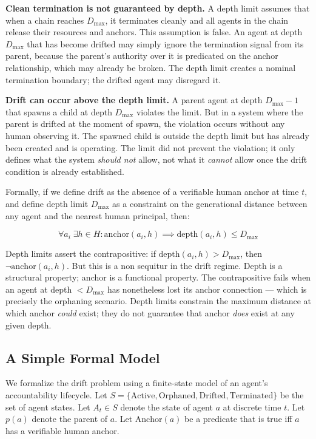 \textbf{Clean termination is not guaranteed by depth.} A depth limit assumes that when a chain reaches $D_{\max}$, it terminates cleanly and all agents in the chain release their resources and anchors. This assumption is false. An agent at depth $D_{\max}$ that has become drifted may simply ignore the termination signal from its parent, because the parent's authority over it is predicated on the anchor relationship, which may already be broken. The depth limit creates a nominal termination boundary; the drifted agent may disregard it.

\textbf{Drift can occur above the depth limit.} A parent agent at depth $D_{\max} - 1$ that spawns a child at depth $D_{\max}$ violates the limit. But in a system where the parent is drifted at the moment of spawn, the violation occurs without any human observing it. The spawned child is outside the depth limit but has already been created and is operating. The limit did not prevent the violation; it only defines what the system \emph{should not} allow, not what it \emph{cannot} allow once the drift condition is already established.

Formally, if we define drift as the absence of a verifiable human anchor at time $t$, and define depth limit $D_{\max}$ as a constraint on the generational distance between any agent and the nearest human principal, then:

\[
\forall a_i \; \exists h \in H : \text{anchor}(a_i, h) \implies \text{depth}(a_i, h) \leq D_{\max}
\]

Depth limits assert the contrapositive: if $\text{depth}(a_i, h) > D_{\max}$, then $\neg \text{anchor}(a_i, h)$. But this is a non sequitur in the drift regime. Depth is a structural property; anchor is a functional property. The contrapositive fails when an agent at depth $< D_{\max}$ has nonetheless lost its anchor connection --- which is precisely the orphaning scenario. Depth limits constrain the maximum distance at which anchor \emph{could} exist; they do not guarantee that anchor \emph{does} exist at any given depth.

\subsection{A Simple Formal Model}

We formalize the drift problem using a finite-state model of an agent's accountability lifecycle. Let $S = \{\text{Active}, \text{Orphaned}, \text{Drifted}, \text{Terminated}\}$ be the set of agent states. Let $A_t \in S$ denote the state of agent $a$ at discrete time $t$. Let $p(a)$ denote the parent of $a$. Let $\text{Anchor}(a)$ be a predicate that is true iff $a$ has a verifiable human anchor.

